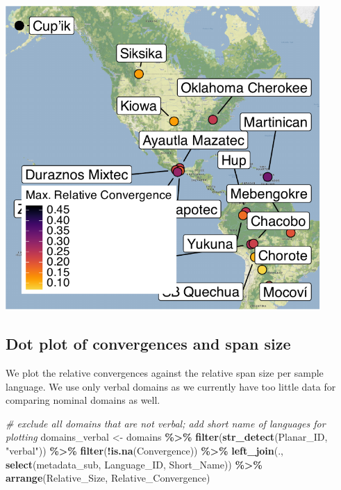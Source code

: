\documentclass[
]{article}
\newenvironment{Shaded}{\begin{snugshade}}{\end{snugshade}}
\newcommand{\CommentTok}[1]{\textcolor[rgb]{0.56,0.35,0.01}{\textit{#1}}}
\newcommand{\FunctionTok}[1]{\textcolor[rgb]{0.13,0.29,0.53}{\textbf{#1}}}
\newcommand{\NormalTok}[1]{#1}
\newcommand{\OtherTok}[1]{\textcolor[rgb]{0.56,0.35,0.01}{#1}}
\newcommand{\SpecialCharTok}[1]{\textcolor[rgb]{0.81,0.36,0.00}{\textbf{#1}}}
\newcommand{\StringTok}[1]{\textcolor[rgb]{0.31,0.60,0.02}{#1}}
\begin{document}
\begin{center}\includegraphics[width=0.9\textwidth,height=\textheight]{02_analyses_chapter17_files/figure-latex/map convergences-1} \end{center}

\subsection{Dot plot of convergences and span
size}\label{dot-plot-of-convergences-and-span-size}

We plot the relative convergences against the relative span size per
sample language. We use only verbal domains as we currently have too
little data for comparing nominal domains as well.

\begin{Shaded}
\begin{Highlighting}[]
\CommentTok{\# exclude all domains that are not verbal; add short name of languages for plotting}
\NormalTok{domains\_verbal }\OtherTok{\textless{}{-}}\NormalTok{ domains }\SpecialCharTok{\%\textgreater{}\%}
  \FunctionTok{filter}\NormalTok{(}\FunctionTok{str\_detect}\NormalTok{(Planar\_ID, }\StringTok{"verbal"}\NormalTok{)) }\SpecialCharTok{\%\textgreater{}\%}
  \FunctionTok{filter}\NormalTok{(}\SpecialCharTok{!}\FunctionTok{is.na}\NormalTok{(Convergence)) }\SpecialCharTok{\%\textgreater{}\%}
  \FunctionTok{left\_join}\NormalTok{(., }\FunctionTok{select}\NormalTok{(metadata\_sub, Language\_ID, Short\_Name)) }\SpecialCharTok{\%\textgreater{}\%}
  \FunctionTok{arrange}\NormalTok{(Relative\_Size, Relative\_Convergence)}
\end{Highlighting}
\end{Shaded}
\end{document}
